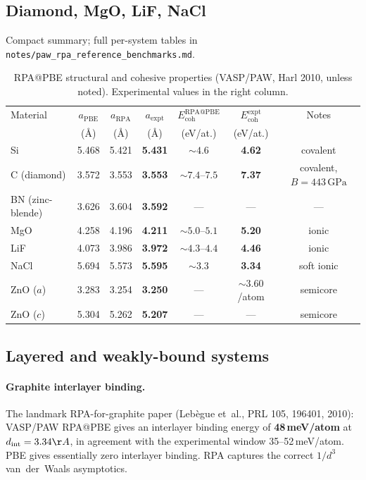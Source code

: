 \documentclass[11pt]{article}
\newcommand{\GPa}{\ensuremath{\,\mathrm{GPa}}}
\newcommand{\target}[1]{\textbf{\textcolor{blue!60!black}{#1}}}
\begin{document}
\subsection{Diamond, MgO, LiF, NaCl}

Compact summary; full per-system tables in
\texttt{notes/paw\_rpa\_reference\_benchmarks.md}.

\begin{table}[h]
\centering
\caption{RPA@PBE structural and cohesive properties (VASP/PAW, Harl 2010,
unless noted). Experimental values in the right column.}
\label{tab:secondary_rpa}
\small
\begin{tabular}{l c c c c c c}
\toprule
Material   & $a_{\mathrm{PBE}}$ & $a_{\mathrm{RPA}}$ & $a_{\mathrm{expt}}$ & $E_{\mathrm{coh}}^{\mathrm{RPA}@\mathrm{PBE}}$ & $E_{\mathrm{coh}}^{\mathrm{expt}}$ & Notes \\
           & (\AA)  & (\AA)  & (\AA)  & (eV/at.) & (eV/at.) & \\
\midrule
Si              & 5.468 & 5.421 & \target{5.431} & $\sim 4.6$    & \target{4.62} & covalent \\
C (diamond)     & 3.572 & 3.553 & \target{3.553} & $\sim 7.4$--$7.5$ & \target{7.37} & covalent, $B=443\GPa$ \\
BN (zinc-blende)& 3.626 & 3.604 & \target{3.592} & ---           & ---           & --- \\
MgO             & 4.258 & 4.196 & \target{4.211} & $\sim 5.0$--$5.1$ & \target{5.20} & ionic \\
LiF             & 4.073 & 3.986 & \target{3.972} & $\sim 4.3$--$4.4$ & \target{4.46} & ionic \\
NaCl            & 5.694 & 5.573 & \target{5.595} & $\sim 3.3$    & \target{3.34} & soft ionic \\
ZnO ($a$)       & 3.283 & 3.254 & \target{3.250} & ---           & $\sim 3.60$/atom & semicore \\
ZnO ($c$)       & 5.304 & 5.262 & \target{5.207} & ---           & ---           & semicore \\
\bottomrule
\end{tabular}
\end{table}

\subsection{Layered and weakly-bound systems}

\paragraph{Graphite interlayer binding.}
The landmark RPA-for-graphite paper (Leb\`egue et~al., PRL 105, 196401,
2010): VASP/PAW RPA@PBE gives an interlayer binding energy of
\target{48\,meV/atom} at $d_{\mathrm{int}} = 3.34\AA$, in agreement with
the experimental window 35--52\,meV/atom. PBE gives essentially zero
interlayer binding. RPA captures the correct $1/d^3$ van~der~Waals
asymptotics.
\end{document}
